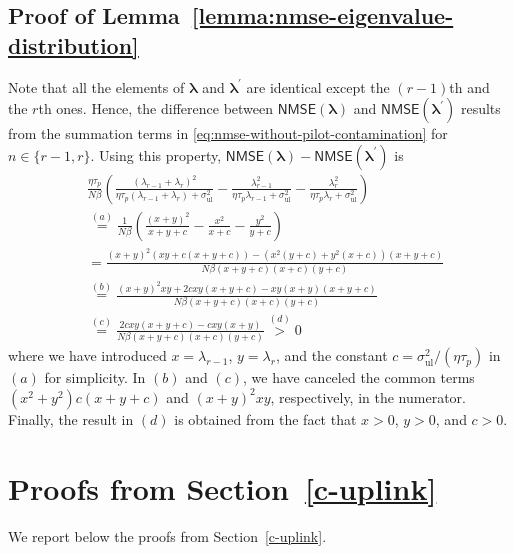 \documentclass[SIG,biber]{nowfnt}
\newcommand{\mathacr}[1]{\mathsf{#1}}
\def\sigmaUL{\sigma^2_{\mathrm{ul}}}
\begin{document}
\subsection{Proof of Lemma~\ref{lemma:nmse-eigenvalue-distribution}}\label{proof-of-lemma:nmse-eigenvalue-distribution}
Note that all the elements of $\boldsymbol{\lambda}$ and $\boldsymbol{\lambda^\prime}$ are identical except the $(r-1)$th and the $r$th ones. Hence, the difference between $\mathacr{NMSE}\left(\boldsymbol{\lambda}\right)$ and $\mathacr{NMSE}\left(\boldsymbol{\lambda^\prime}\right)$ results from the summation terms in \eqref{eq:nmse-without-pilot-contamination} for $n \in \{ r-1, r\}$. Using this property, $\mathacr{NMSE}\left(\boldsymbol{\lambda}\right)- \mathacr{NMSE}\left(\boldsymbol{\lambda^\prime}\right)$ is
\begingroup
\allowdisplaybreaks
	\begin{align}
	&\frac{\eta\tau_p}{N\beta}\left( \frac{(\lambda_{r-1}+\lambda_r)^2}{\eta\tau_p(\lambda_{r-1}+\lambda_r)+\sigmaUL}-\frac{\lambda_{r-1}^2}{\eta\tau_p\lambda_{r-1}+\sigmaUL}-\frac{\lambda_r^2}{\eta\tau_p\lambda_r+\sigmaUL}\right) \nonumber\\
	&\overset{(a)}{=}\frac{1}{N\beta}\left( \frac{(x+y)^2}{x+y+c}-\frac{x^2}{x+c}-\frac{y^2}{y+c}\right) \nonumber \\
	& = \frac{\left(x+y\right)^2\left(xy+c\left(x+y+c\right)\right)-\left(x^2\left(y+c\right)+y^2\left(x+c\right)\right)\left(x+y+c\right)}{N\beta \left(x+y+c\right)\left(x+c\right)\left(y+c\right)} \nonumber \\
	&\overset{(b)}{=} \frac{\left(x+y\right)^2xy+2cxy\left(x+y+c\right)-xy\left(x+y\right)\left(x+y+c\right)}{N\beta \left(x+y+c\right)\left(x+c\right)\left(y+c\right)}  \nonumber \\
	& \overset{(c)}{=} \frac{2cxy\left(x+y+c\right)-cxy\left(x+y\right)}{N\beta \left(x+y+c\right)\left(x+c\right)\left(y+c\right)}  \overset{(d)}{>}0 
 	\end{align}
 	\endgroup
	where we have introduced $x=\lambda_{r-1}$, $y=\lambda_r$, and the constant $c=\sigmaUL/(\eta\tau_p)$ in $(a)$ for simplicity. In $(b)$ and $(c)$, we have canceled the common terms $(x^2+y^2)c(x+y+c)$ and $\left(x+y\right)^2xy$, respectively, in the numerator. Finally, the result in $(d)$ is obtained from the fact that $x>0$, $y>0$, and $c>0$.
	
	
	\section{Proofs from Section~\ref{c-uplink}}
	We report below the proofs from Section~\ref{c-uplink}. 
\end{document}
